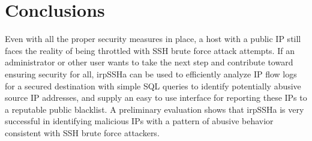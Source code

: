\section{Conclusions}
Even with all the proper security measures in place, a host with a public IP still faces the reality of being throttled with SSH brute force attack attempts. If an administrator or other user wants to take the next step and contribute toward ensuring security for all, irpSSHa can be used to efficiently analyze IP flow logs for a secured destination with simple SQL queries to identify potentially abusive source IP addresses, and supply an easy to use interface for reporting these IPs to a reputable public blacklist. A preliminary evaluation shows that irpSSHa is very successful in identifying malicious IPs with a pattern of abusive behavior consistent with SSH brute force attackers. 
\label{sec:conclusion}

